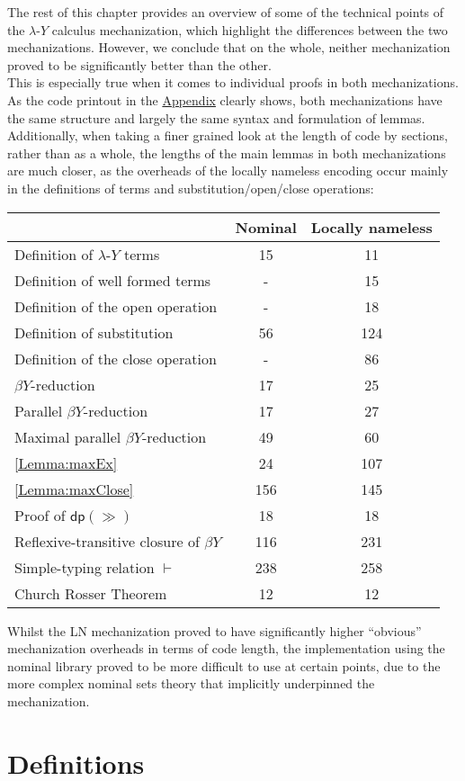 \documentclass[a4paper, 12pt, twoside]{style/ociamthesis}
\theoremstyle{plain}
\theoremstyle{definition}
\theoremstyle{remark}
\newcommand{\lamy}{\lambda\text{-}Y}
\newcommand{\dip}{\textsf{dp}}
\begin{document}
The rest of this chapter provides an overview of some of the technical
points of the \(\lamy\) calculus mechanization, which highlight the
differences between the two mechanizations. However, we conclude that on
the whole, neither mechanization proved to be significantly better than
the other.\\
This is especially true when it comes to individual proofs in both
mechanizations. As the code printout in the
\hyperref[appendix]{Appendix} clearly shows, both mechanizations have
the same structure and largely the same syntax and formulation of
lemmas.\\
Additionally, when taking a finer grained look at the length of code by
sections, rather than as a whole, the lengths of the main lemmas in both
mechanizations are much closer, as the overheads of the locally nameless
encoding occur mainly in the definitions of terms and
substitution/open/close operations:

\begin{longtable}[]{@{}lcc@{}}
\toprule
\(\ \) & Nominal & Locally nameless\tabularnewline
\midrule
\endhead
Definition of \(\lamy\) terms & 15 & 11\tabularnewline
Definition of well formed terms & - & 15\tabularnewline
Definition of the open operation & - & 18\tabularnewline
Definition of substitution & 56 & 124\tabularnewline
Definition of the close operation & - & 86\tabularnewline
\(\beta Y\)-reduction & 17 & 25\tabularnewline
Parallel \(\beta Y\)-reduction & 17 & 27\tabularnewline
Maximal parallel \(\beta Y\)-reduction & 49 & 60\tabularnewline
\cref{Lemma:maxEx} & 24 & 107\tabularnewline
\cref{Lemma:maxClose} & 156 & 145\tabularnewline
Proof of \(\dip(\gg)\) & 18 & 18\tabularnewline
Reflexive-transitive closure of \(\beta Y\) & 116 & 231\tabularnewline
Simple-typing relation \(\vdash\) & 238 & 258\tabularnewline
Church Rosser Theorem & 12 & 12\tabularnewline
\bottomrule
\end{longtable}

Whilst the LN mechanization proved to have significantly higher
``obvious'' mechanization overheads in terms of code length, the
implementation using the nominal library proved to be more difficult to
use at certain points, due to the more complex nominal sets theory that
implicitly underpinned the mechanization.

\section{Definitions}\label{definitions}
\end{document}
